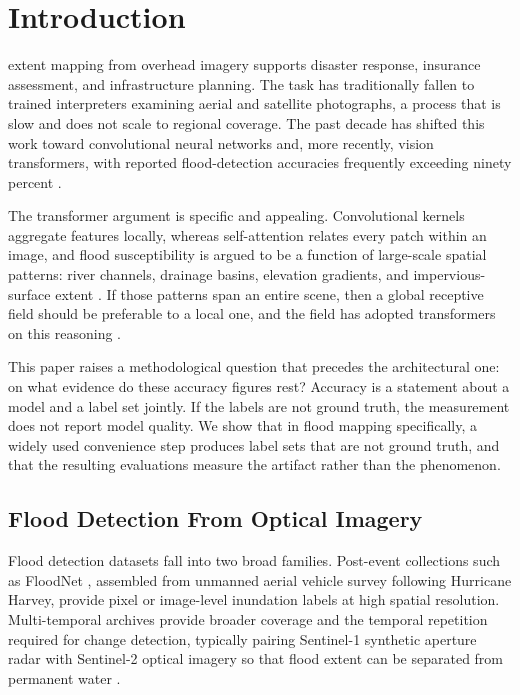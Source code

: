 \section{Introduction}
\label{sec:intro}

 extent mapping from overhead imagery supports disaster
response, insurance assessment, and infrastructure planning. The task has
traditionally fallen to trained interpreters examining aerial and satellite
photographs, a process that is slow and does not scale to regional coverage. The
past decade has shifted this work toward convolutional neural networks and, more
recently, vision transformers, with reported flood-detection accuracies
frequently exceeding ninety percent \cite{b1,b2,b3,b4,b5}.

The transformer argument is specific and appealing. Convolutional kernels
aggregate features locally, whereas self-attention relates every patch within an
image, and flood susceptibility is argued to be a function of large-scale
spatial patterns: river channels, drainage basins, elevation gradients, and
impervious-surface extent \cite{b6}. If those patterns span an entire scene, then
a global receptive field should be preferable to a local one, and the field has
adopted transformers on this reasoning \cite{b1,b2,b7,b8}.

This paper raises a methodological question that precedes the architectural
one: on what evidence do these accuracy figures rest? Accuracy is a statement
about a model and a label set jointly. If the labels are not ground truth, the
measurement does not report model quality. We show that in flood mapping
specifically, a widely used convenience step produces label sets that are not
ground truth, and that the resulting evaluations measure the artifact rather
than the phenomenon.

\subsection{Flood Detection From Optical Imagery}

Flood detection datasets fall into two broad families. Post-event collections
such as FloodNet \cite{b9}, assembled from unmanned aerial vehicle survey
following Hurricane Harvey, provide pixel or image-level inundation labels at
high spatial resolution. Multi-temporal archives provide broader coverage and the
temporal repetition required for change detection, typically pairing Sentinel-1
synthetic aperture radar with Sentinel-2 optical imagery so that flood extent
can be separated from permanent water \cite{b10}.

